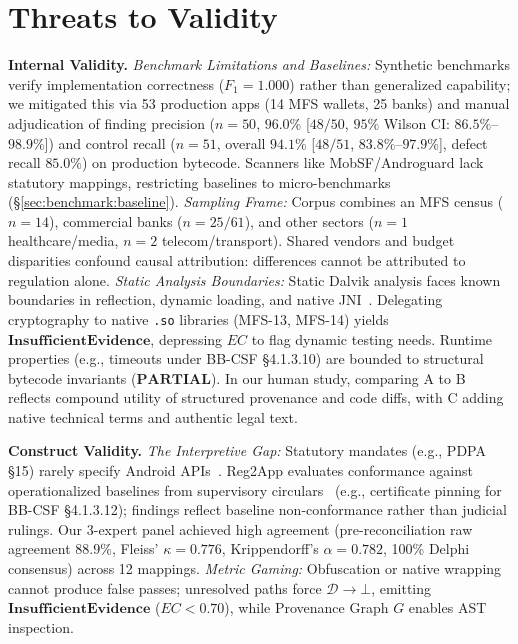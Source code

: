 \section{Threats to Validity}
\label{sec:threats}
\noindent\textbf{Internal Validity.} \textit{Benchmark Limitations and Baselines:} Synthetic benchmarks verify implementation correctness ($F_1 = 1.000$) rather than generalized capability; we mitigated this via 53 production apps (14 MFS wallets, 25 banks) and manual adjudication of finding precision ($n=50$, $96.0\%$ [$48/50$, $95\%$ Wilson CI: $86.5\%$--$98.9\%$]) and control recall ($n=51$, overall $94.1\%$ [$48/51$, $83.8\%$--$97.9\%$], defect recall $85.0\%$) on production bytecode. Scanners like MobSF/Androguard lack statutory mappings, restricting baselines to micro-benchmarks (§\ref{sec:benchmark:baseline}). \textit{Sampling Frame:} Corpus combines an MFS census ($n=14$), commercial banks ($n=25/61$), and other sectors ($n=1$ healthcare/media, $n=2$ telecom/transport). Shared vendors and budget disparities confound causal attribution: differences cannot be attributed to regulation alone. \textit{Static Analysis Boundaries:} Static Dalvik analysis faces known boundaries in reflection, dynamic loading, and native JNI~\cite{flowdroid, amandroid, octeau_reflection, ernst_static_dynamic}. Delegating cryptography to native \texttt{.so} libraries (MFS-13, MFS-14) yields $\mathbf{InsufficientEvidence}$, depressing $EC$ to flag dynamic testing needs. Runtime properties (e.g., timeouts under BB-CSF §4.1.3.10) are bounded to structural bytecode invariants ($\mathbf{PARTIAL}$). In our human study, comparing A to B reflects compound utility of structured provenance and code diffs, with C adding native technical terms and authentic legal text.

\noindent\textbf{Construct Validity.} \textit{The Interpretive Gap:} Statutory mandates (e.g., PDPA §15) rarely specify Android APIs~\cite{breaux_requirements}. Reg2App evaluates conformance against operationalized baselines from supervisory circulars~\cite{owasp_masvs} (e.g., certificate pinning for BB-CSF §4.1.3.12); findings reflect baseline non-conformance rather than judicial rulings. Our 3-expert panel achieved high agreement (pre-reconciliation raw agreement $88.9\%$, Fleiss' $\kappa = 0.776$, Krippendorff's $\alpha = 0.782$, 100\% Delphi consensus) across 12 mappings. \textit{Metric Gaming:} Obfuscation or native wrapping cannot produce false passes; unresolved paths force $\mathcal{D} \rightarrow \bot$, emitting $\mathbf{InsufficientEvidence}$ ($EC < 0.70$), while Provenance Graph $G$ enables AST inspection.

